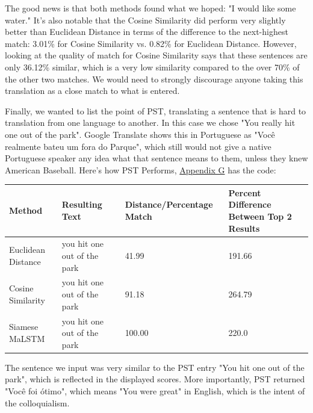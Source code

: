 \documentclass[runningheads]{llncs}
\begin{document}
	The good news is that both methods found what we hoped: "I would like some water." It's also notable that the Cosine Similarity did perform very slightly better than Euclidean Distance in terms of the difference to the next-highest match: 3.01\% for Cosine Similarity vs. 0.82\% for Euclidean Distance. However, looking at the quality of match for Cosine Similarity says that these sentences are only 36.12\% similar, which is a very low similarity compared to the over 70\% of the other two matches. We would need to strongly discourage anyone taking this translation as a close match to what is entered.

	Finally, we wanted to list the point of PST, translating a sentence that is hard to translation from one language to another. In this case we chose "You really hit one out of the park". Google Translate shows this in Portuguese as "Você realmente bateu um fora do Parque", which still would not give a native Portuguese speaker any idea what that sentence means to them, unless they knew American Baseball. Here's how PST Performs, \hyperlink{Appendix G}{Appendix G} has the code:



\vspace{10 mm}
	\begin{minipage}{\linewidth}
		\begin{center}
			\begin{tabular}{| l | l | l | l |}
			  \hline			
			  Method & Resulting Text & Distance/Percentage Match & Percent Difference Between Top 2 Results \\
			  \hline			
			  Euclidean Distance & you hit one out of the park & 41.99 & 191.66 \\
			  \hline			
			  Cosine Similarity & you hit one out of the park & 91.18 & 264.79 \\
			  \hline  
			  Siamese MaLSTM & you hit one out of the park & 100.00 & 220.0 \\
			  \hline
			\end{tabular}
		\end{center}
	\end{minipage}
	\afterpage{\clearpage}
\vspace{10 mm}

	The sentence we input was very similar to the PST entry "You hit one out of the park", which is reflected in the displayed scores. More importantly, PST returned "Você foi ótimo", which means "You were great" in English, which is the intent of the colloquialism. 
\end{document}
